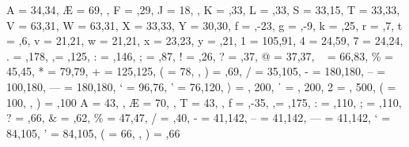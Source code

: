    {
     A = {34,34},
     Æ = {69,  },
     F = {  ,29},
     J = {18,  },
     K = {  ,33},
     L = {  ,33},
     S = {33,15},
     T = {33,33},
     V = {63,31},
     W = {63,31},
     X = {33,33},
     Y = {30,30},
     f = {  ,-23},
     g = {  ,-9},
     k = {  ,25},
     r = {  ,7},
     t = {  ,6},
     v = {21,21},
     w = {21,21},
     x = {23,23},
     y = {  ,21},
     1 = {105,91},
     4 = {24,59},
     7 = {24,24},
     . = { ,178},
    {,}= { ,125},
     : = { ,146},
     ; = { ,87},
     ! = { ,26},
     ? = { ,37},
     @ = {37,37},
     ~ = {66,83},
    \% = {45,45},
     * = {79,79},
     + = {125,125},
     ( = {78,   },
     ) = {   ,69},
     / = {35,105},
     - = {180,180}, %
     – = {100,180}, %
     — = {180,180}, %
     ‘ = {96,76},
     ’ = {76,120},%
     〉 = { , 200},%
     ˈ = { , 200},%
     2 = { , 500},
     ( = {100,   },
     ) = {   ,100}
   }
   {
     A = {43,  },
     Æ = {70,  },
     T = {43,  },
     f = {  ,-35},
    {,}= { ,175},
     : = { ,110},
     ; = { ,110},
     ? = { ,66},
     & = {  ,62},
    \% = {47,47},
     / = {  ,40},
     - = {41,142}, %
     – = {41,142}, %
     — = {41,142}, %
     ‘ = {84,105},
     ’ = {84,105},
     ( = {66,   },
     ) = {   ,66}
   }

